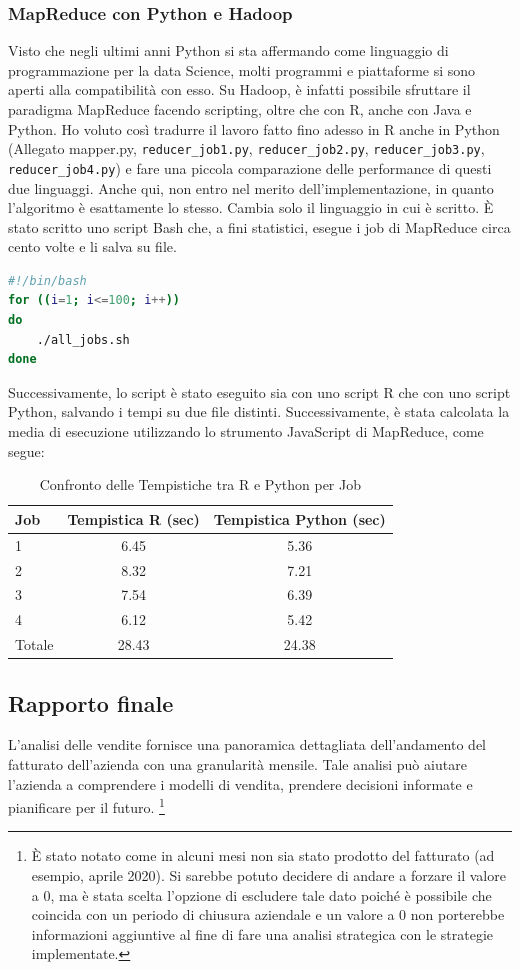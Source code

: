 \subsubsection{MapReduce con Python e Hadoop}
Visto che negli ultimi anni Python si sta affermando come linguaggio di programmazione per la data Science, molti programmi e piattaforme si sono aperti alla compatibilità con esso. Su Hadoop, è infatti possibile sfruttare il paradigma MapReduce facendo scripting, oltre che con R, anche con Java e Python. Ho voluto così tradurre il lavoro fatto fino adesso in R anche in Python (Allegato mapper.py, \texttt{reducer\_job1.py}, \texttt{reducer\_job2.py}, \texttt{reducer\_job3.py}, \texttt{reducer\_job4.py}) e fare una piccola comparazione delle performance di questi due linguaggi. Anche qui, non entro nel merito dell'implementazione, in quanto l'algoritmo è esattamente lo stesso. Cambia solo il linguaggio in cui è scritto.
È stato scritto uno script Bash che, a fini statistici, esegue i job di MapReduce circa cento volte e li salva su file.
\begin{lstlisting}[language=Bash, caption={Script per il salvataggio dei tempi}]
#!/bin/bash
for ((i=1; i<=100; i++))
do
    ./all_jobs.sh
done
\end{lstlisting}
Successivamente, lo script è stato eseguito sia con uno script R che con uno script Python, salvando i tempi su due file distinti. Successivamente, è stata calcolata la media di esecuzione utilizzando lo strumento JavaScript di MapReduce, come segue:
\begin{table}[htbp]
    \centering
    \caption{Confronto delle Tempistiche tra R e Python per Job}
    \begin{tabular}{|lcc|}
        \hline
        Job & Tempistica R (sec) & Tempistica Python (sec) \\
        \hline
        1 & 6.45 & 5.36 \\
        2 & 8.32 & 7.21 \\
        3 & 7.54 & 6.39 \\
        4 & 6.12 & 5.42 \\
        \hline
        Totale & 28.43 & 24.38 \\
        \hline
    \end{tabular}
    \label{tab:confronto-tempistiche}
\end{table}
\subsection{Rapporto finale}
L'analisi delle vendite fornisce una panoramica dettagliata dell'andamento del fatturato dell'azienda con una granularità mensile. Tale analisi può aiutare l'azienda a comprendere i modelli di vendita, prendere decisioni informate e pianificare per il futuro. \footnote{È stato notato come in alcuni mesi non sia stato prodotto del fatturato (ad esempio, aprile 2020). Si sarebbe potuto decidere di andare a forzare il valore a 0, ma è stata scelta l'opzione di escludere tale dato poiché è possibile che coincida con un periodo di chiusura aziendale e un valore a 0 non porterebbe informazioni aggiuntive al fine di fare una analisi strategica con le strategie implementate.}
